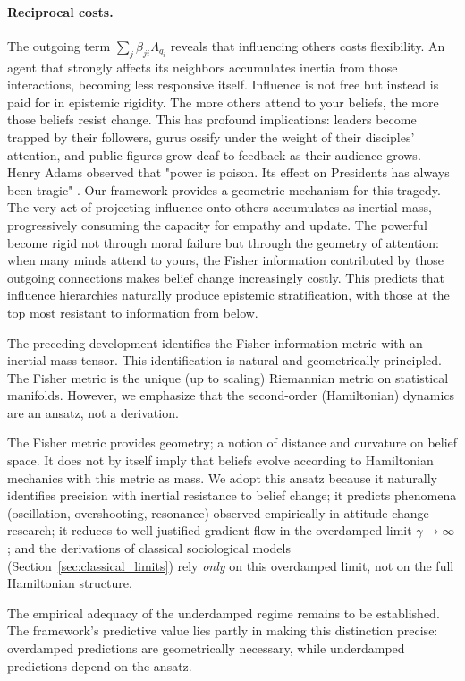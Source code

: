 \documentclass[12pt]{article}
\begin{document}
\paragraph{Reciprocal costs.} The outgoing term $\sum_j \beta_{ji}\Lambda_{q_i}$ reveals that influencing others costs flexibility. An agent that strongly affects its neighbors accumulates inertia from those interactions, becoming less responsive itself. Influence is not free but instead is paid for in epistemic rigidity. The more others attend to your beliefs, the more those beliefs resist change. This has profound implications: leaders become trapped by their followers, gurus ossify under the weight of their disciples' attention, and public figures grow deaf to feedback as their audience grows. Henry Adams observed that "power is poison. Its effect on Presidents has always been tragic" \citep{adams1918education}. Our framework provides a geometric mechanism for this tragedy. The very act of projecting influence onto others accumulates as inertial mass, progressively consuming the capacity for empathy and update. The powerful become rigid not through moral failure but through the geometry of attention: when many minds attend to yours, the Fisher information contributed by those outgoing connections makes belief change increasingly costly. This predicts that influence hierarchies naturally produce epistemic stratification, with those at the top most resistant to information from below.

\begin{tcolorbox}[colback=yellow!5,colframe=orange!75,title=Important Caveat: The Hamiltonian as Ansatz]

The preceding development identifies the Fisher information metric with an inertial mass tensor. This identification is natural and geometrically principled.  The Fisher metric is the unique (up to scaling) Riemannian metric on statistical manifolds. However, we emphasize that the second-order (Hamiltonian) dynamics are an ansatz, not a derivation.

The Fisher metric provides geometry; a notion of distance and curvature on belief space. It does not by itself imply that beliefs evolve according to Hamiltonian mechanics with this metric as mass. We adopt this ansatz because it naturally identifies precision with inertial resistance to belief change; it predicts phenomena (oscillation, overshooting, resonance) observed empirically in attitude change research; it reduces to well-justified gradient flow in the overdamped limit $\gamma \to \infty$; and the derivations of classical sociological models (Section~\ref{sec:classical_limits}) rely \emph{only} on this overdamped limit, not on the full Hamiltonian structure.

The empirical adequacy of the underdamped regime remains to be established. The framework's predictive value lies partly in making this distinction precise: overdamped predictions are geometrically necessary, while underdamped predictions depend on the ansatz.
\end{tcolorbox}
\end{document}
